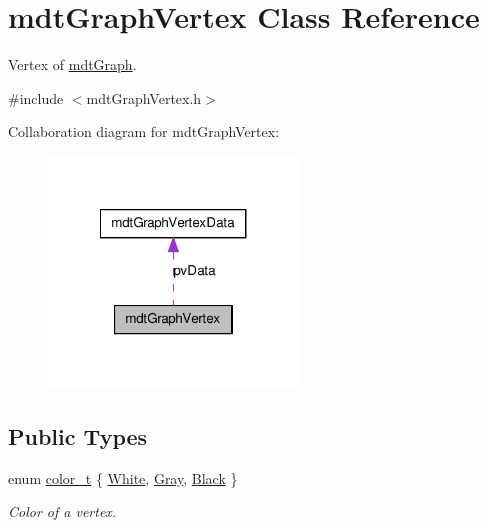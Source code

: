 \hypertarget{classmdt_graph_vertex}{
\section{mdtGraphVertex Class Reference}
\label{classmdt_graph_vertex}
}


Vertex of \hyperlink{classmdt_graph}{mdtGraph}.  




{\ttfamily \#include $<$mdtGraphVertex.h$>$}



Collaboration diagram for mdtGraphVertex:\nopagebreak
\begin{figure}[H]
\begin{center}
\leavevmode
\includegraphics[width=188pt]{classmdt_graph_vertex__coll__graph}
\end{center}
\end{figure}
\subsection*{Public Types}
\begin{DoxyCompactItemize}
\item 
enum \hyperlink{classmdt_graph_vertex_ae658709c9b5a918bf614bfbf79ac49a5}{color\_\-t} \{ \hyperlink{classmdt_graph_vertex_ae658709c9b5a918bf614bfbf79ac49a5adb79d280cadf0fbcf7f8b3c032294e26}{White}, 
\hyperlink{classmdt_graph_vertex_ae658709c9b5a918bf614bfbf79ac49a5a8e0204f5dac7a1b7b6b299673ed39ef6}{Gray}, 
\hyperlink{classmdt_graph_vertex_ae658709c9b5a918bf614bfbf79ac49a5ade319c74cc7baa5229e487a93cacca30}{Black}
 \}
\begin{DoxyCompactList}\small\item\em Color of a vertex. \end{DoxyCompactList}\end{DoxyCompactItemize}
